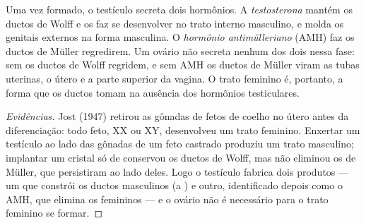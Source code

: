 \begin{proposition}\label{prop:g11:becoming-male-female:hormones}
Uma vez formado, o testículo secreta dois hormônios. A
\emph{testosterona} mantém os ductos de Wolff e os
faz se desenvolver no trato interno masculino, e molda os genitais
externos na forma masculina. O \emph{hormônio antimülleriano} (AMH) faz
os ductos de Müller regredirem. Um ovário não secreta nenhum dos dois
nessa fase: sem  os ductos de Wolff regridem, e sem AMH os
ductos de Müller viram as tubas uterinas, o útero e a parte superior da
vagina. O trato feminino é, portanto, a forma que os ductos tomam na
ausência dos hormônios testiculares.
\end{proposition}
\begin{proof}[Evidências]
Jost (1947) retirou as gônadas de fetos de coelho no útero antes da
diferenciação: todo feto, XX ou XY, desenvolveu um trato feminino.
Enxertar um testículo ao lado das gônadas de um feto castrado produziu
um trato masculino; implantar um cristal só de  conservou
os ductos de Wolff, mas não eliminou os de Müller, que persistiram ao
lado deles. Logo o testículo fabrica dois produtos --- um que constrói
os ductos masculinos (a ) e outro, identificado depois como
o AMH, que elimina os femininos --- e o ovário não é necessário para o
trato feminino se formar.
\end{proof}


